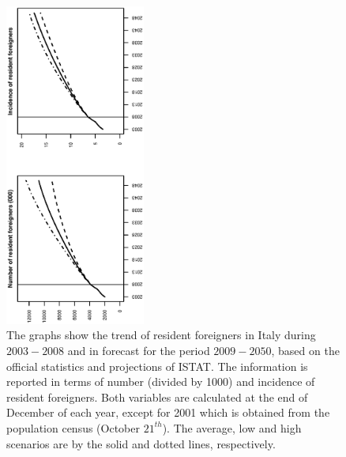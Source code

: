 \documentclass[10pt] {article}
\theoremstyle{definition}
\theoremstyle{plain}
\begin{document}
\begin{figure}[htbp]
	\centering
		\includegraphics[width=0.41\textwidth, angle=270]{Figure1.eps}
	\caption{The graphs show the trend of resident foreigners in Italy during $2003-2008$ and in forecast for the period $2009-2050$, based on the official statistics and projections of ISTAT. The information is reported in terms of number (divided by 1000) and incidence of resident foreigners. Both variables are calculated at the end of December of each year, except for 2001 which is obtained from the population census (October $21^{th}$). The average, low and high scenarios are by the solid and dotted lines, respectively.}
	\label{fig1}
\end{figure}
\end{document}
